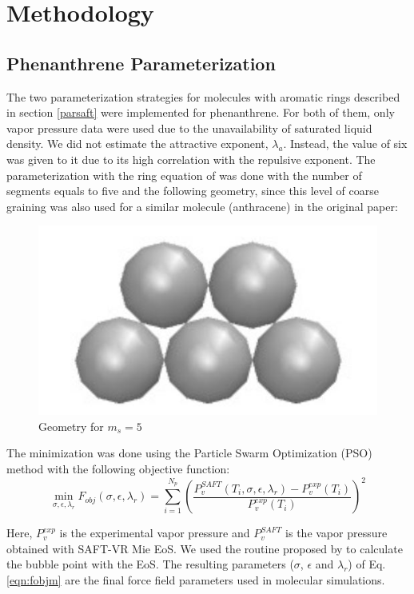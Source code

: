 \chapter{Methodology} %

\label{Chapter4} %

\section{Phenanthrene Parameterization}\label{parame}

The two parameterization strategies for molecules with aromatic rings described in section \ref{parsaft} were implemented for phenanthrene. For both of them, only vapor pressure data \cite{pvphen} were used due to the unavailability of saturated liquid density. We did not estimate the attractive exponent, $\lambda _{a}$. Instead, the value of six was given to it due to its high correlation with the repulsive exponent. The parameterization with the ring equation of  was done with the number of segments equals to five and the following geometry, since this level of coarse graining was also used for a similar molecule (anthracene) in the original paper:
\begin{figure}[th]
	\centering
	\includegraphics[width=0.25\linewidth]{Figures/fen5}
	\caption{Geometry for $m_{s}=5$}
	\label{fig:fen5}
\end{figure}

The minimization was done using the Particle Swarm Optimization (PSO)  method \cite{pso} with the following objective function:
\begin{equation}
\min\limits_{\sigma,\epsilon,\lambda_{r}} F_{obj}(\sigma,\epsilon,\lambda_{r})= \sum_{i=1}^{N_{p}} \left(\frac{P_{v}^{SAFT}(T_{i},\sigma,\epsilon,\lambda_{r})-P_{v}^{exp}(T_{i})}{P_{v}^{exp}(T_{i})} \right)^2
\label{eqn:fobjm}
\end{equation}

Here, $P_{v}^{exp}$ is the experimental vapor pressure and $P_{v}^{SAFT}$ is the vapor pressure obtained with SAFT-VR Mie EoS. We used the routine proposed by   to calculate the bubble point with the EoS. The resulting  parameters ($\sigma$, $\epsilon $ and $\lambda _{r}$) of Eq. \eqref{eqn:fobjm} are the final force field parameters used in molecular simulations. 


